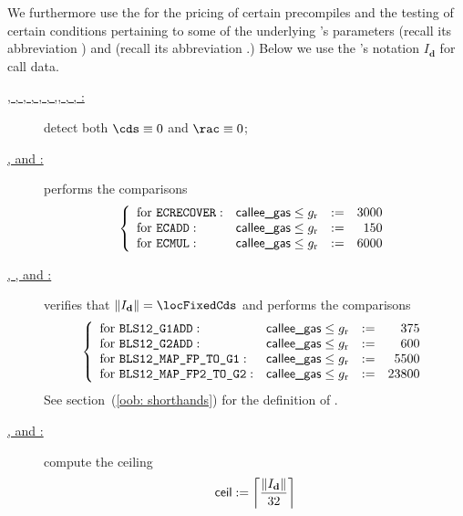 We furthermore use the \oobMod{} for the pricing of certain precompiles and the testing of certain conditions pertaining to some of the underlying 's parameters
\CDS{} (recall its abbreviation \cds{}) and
\RAC{} (recall its abbreviation \rac{}.)
\saNote{} Below we use the \cite{EYP}'s notation $I_\textbf{d}$ for call data.
\begin{description}
	\item[\underline{, , , , , , ,, , , :}]
	detect both $\cds \equiv 0$ and $\rac \equiv 0$; 
	\item[\underline{,  and :}]
		performs the comparisons
		\[
			\left\{ \begin{array}{llcrcl}
				\text{for }\texttt{ECRECOVER}          	: & \textsf{callee\_gas} \leq g_\text{r} & := &  3000 \\
				\text{for }\texttt{ECADD}              	: & \textsf{callee\_gas} \leq g_\text{r} & := &   150 \\
				\text{for }\texttt{ECMUL}              	: & \textsf{callee\_gas} \leq g_\text{r} & := &  6000 \\
			\end{array} \right.
		\]
	\item[\underline{, ,  and :}]
		verifies that $\| I_\textbf{d} \| = \locFixedCds$ and performs the comparisons
		\[
			\left\{ \begin{array}{llcrcl}
				\text{for }\texttt{BLS12\_G1ADD}        	    : & \textsf{callee\_gas} \leq g_\text{r} & := &   375 \\
				\text{for }\texttt{BLS12\_G2ADD}        	    : & \textsf{callee\_gas} \leq g_\text{r} & := &   600 \\
				\text{for }\texttt{BLS12\_MAP\_FP\_TO\_G1} 	: & \textsf{callee\_gas} \leq g_\text{r} & := &  5500 \\
				\text{for }\texttt{BLS12\_MAP\_FP2\_TO\_G2} 	: & \textsf{callee\_gas} \leq g_\text{r} & := & 23800 \\
			\end{array} \right.
		\]
		See section~(\ref{oob: shorthands}) for the definition of \locFixedCds{}.	
	\item[\underline{,  and :}]
		compute the ceiling
		\[ \textsf{ceil} := \left \lceil \frac{\| I_\textbf{d} \|}{32} \right \rceil \]

\end{description}
